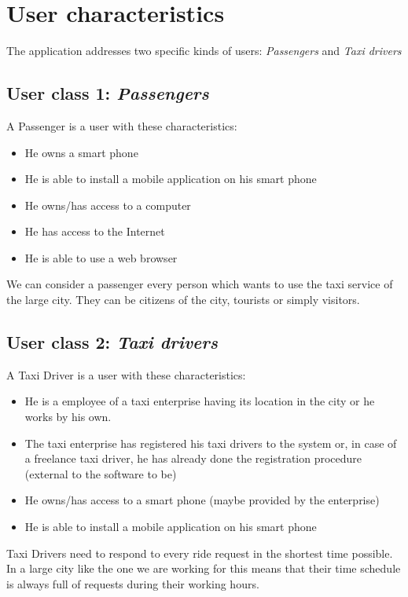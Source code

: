 \section{User characteristics}
The application addresses two specific kinds of users: \textit{Passengers} and \textit{Taxi drivers}
\subsection{User class 1: \textit{Passengers}}
A Passenger is a user with these characteristics:
\begin{itemize}
\item He owns a smart phone
\item He is able to install a mobile application on his smart phone
\item He owns/has access to a computer
\item He has access to the Internet
\item He is able to use a web browser
\end{itemize}
We can consider a passenger every person which wants to use the taxi service of the large city. They can be citizens of the city, tourists or simply visitors.
\subsection{User class 2: \textit{Taxi drivers}}
A Taxi Driver is a user with these characteristics:
\begin{itemize}
\item He is a employee of a taxi enterprise having its location in the city or he works by his own.
\item The taxi enterprise has registered his taxi drivers to the system or, in case of a freelance taxi driver, he has already done the registration procedure (external to the software to be)
\item He owns/has access to a smart phone (maybe provided by the enterprise)
\item He is able to install a mobile application on his smart phone
\end{itemize}
Taxi Drivers need to respond to every ride request in the shortest time possible. In a large city like the one we are working for this means that their time schedule is always full of requests during their working hours.